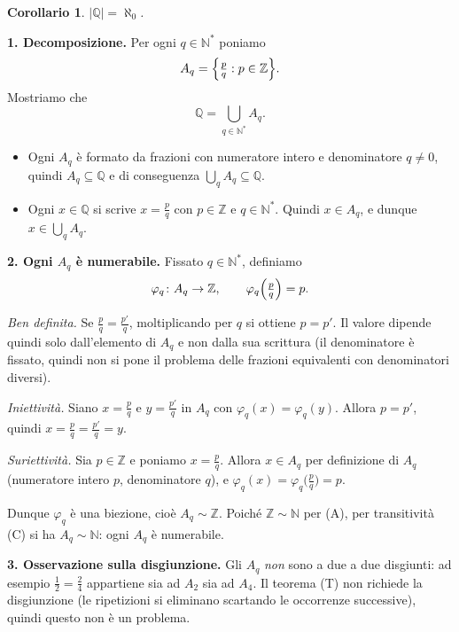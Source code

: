 \documentclass[11pt,a4paper]{article}
\newcommand{\Q}{\mathbb{Q}}
\theoremstyle{definition}
\theoremstyle{plain}
\newtheorem{corollario}[definizione]{Corollario}
\theoremstyle{remark}
\begin{document}
\begin{corollario}\label{cor:Q}
$|\Q|=\aleph_0$.
\end{corollario}

\noindent\textbf{1. Decomposizione.} Per ogni $q\in\mathbb{N}^*$ poniamo
\[
A_q=\Bigl\{\tfrac{p}{q} : p\in\mathbb{Z}\Bigr\}.
\]
Mostriamo che
\[
\mathbb{Q}=\bigcup_{q\in\mathbb{N}^*}A_q .
\]

\begin{itemize}
  \item[($\supseteq$)] Ogni $A_q$ \`e formato da frazioni con numeratore
        intero e denominatore $q\neq0$, quindi $A_q\subseteq\mathbb{Q}$ e di
        conseguenza $\bigcup_q A_q\subseteq\mathbb{Q}$.
  \item[($\subseteq$)] Ogni $x\in\mathbb{Q}$ si scrive $x=\tfrac{p}{q}$ con
        $p\in\mathbb{Z}$ e $q\in\mathbb{N}^*$. Quindi $x\in A_q$, e dunque
        $x\in\bigcup_q A_q$.
\end{itemize}

\noindent\textbf{2. Ogni $A_q$ \`e numerabile.} Fissato $q\in\mathbb{N}^*$,
definiamo
\[
\varphi_q\colon A_q\to\mathbb{Z},\qquad \varphi_q\Bigl(\tfrac{p}{q}\Bigr)=p .
\]

\emph{Ben definita.} Se $\tfrac{p}{q}=\tfrac{p'}{q}$, moltiplicando per $q$
si ottiene $p=p'$. Il valore dipende quindi solo dall'elemento di $A_q$ e non
dalla sua scrittura (il denominatore \`e fissato, quindi non si pone il
problema delle frazioni equivalenti con denominatori diversi).

\emph{Iniettivit\`a.} Siano $x=\tfrac{p}{q}$ e $y=\tfrac{p'}{q}$ in $A_q$
con $\varphi_q(x)=\varphi_q(y)$. Allora $p=p'$, quindi $x=\tfrac{p}{q}=
\tfrac{p'}{q}=y$.

\emph{Suriettivit\`a.} Sia $p\in\mathbb{Z}$ e poniamo $x=\tfrac{p}{q}$.
Allora $x\in A_q$ per definizione di $A_q$ (numeratore intero $p$,
denominatore $q$), e $\varphi_q(x)=\varphi_q\bigl(\tfrac{p}{q}\bigr)=p$.

Dunque $\varphi_q$ \`e una biezione, cio\`e $A_q\sim\mathbb{Z}$. Poich\'e
$\mathbb{Z}\sim\mathbb{N}$ per (A), per transitivit\`a (C) si ha
$A_q\sim\mathbb{N}$: ogni $A_q$ \`e numerabile.

\medskip
\noindent\textbf{3. Osservazione sulla disgiunzione.} Gli $A_q$ \emph{non}
sono a due a due disgiunti: ad esempio $\tfrac12=\tfrac24$ appartiene sia ad
$A_2$ sia ad $A_4$. Il teorema (T) non richiede la disgiunzione (le
ripetizioni si eliminano scartando le occorrenze successive), quindi
questo non \`e un problema.
\end{document}

